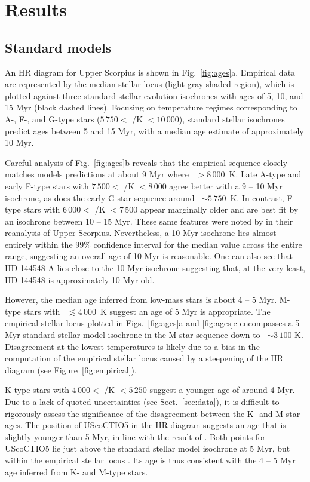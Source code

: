 \documentclass{aa}
\begin{document}
\section{Results}
\label{sec:results}

\subsection{Standard models}
An HR diagram for Upper Scorpius is shown in Fig.~\ref{fig:ages}a. Empirical data are represented by the median stellar locus (light-gray shaded region), which is plotted against three standard stellar evolution isochrones with ages of 5, 10, and 15 Myr (black dashed lines). Focusing on temperature regimes corresponding to A-, F-, and G-type stars ($5\,750 <$ \teff/K $< 10\,000$), standard stellar isochrones predict ages between 5 and 15 Myr, with a median age estimate of approximately 10 Myr. 

Careful analysis of Fig.~\ref{fig:ages}b reveals that the empirical sequence closely matches models predictions at about 9 Myr where \teff~$> 8\,000$~K. Late A-type and early F-type stars with $7\,500 < $ \teff/K $ < 8\,000$ agree better with a 9 -- 10 Myr isochrone, as does the early-G-star sequence around \teff\ $\sim 5\,750$~K. In contrast, F-type stars with $6\,000 <$ \teff/K $< 7\,500$ appear marginally older and are best fit by an isochrone between 10 -- 15 Myr. These same features were noted by \citet{Pecaut2012} in their reanalysis of Upper Scorpius. Nevertheless, a 10 Myr isochrone lies almost entirely within the 99\% confidence interval for the median value across the entire range, suggesting an overall age of 10 Myr is reasonable. One can also see that HD 144548 A lies close to the 10 Myr isochrone suggesting that, at the very least, HD 144548 is approximately 10 Myr old.

However, the median age inferred from low-mass stars is about 4 -- 5 Myr. M-type stars with \teff\ $\lesssim 4\,000$~K suggest an age of 5 Myr is appropriate. The empirical stellar locus plotted in Figs.~\ref{fig:ages}a and \ref{fig:ages}c encompasses a 5 Myr standard stellar model isochrone in the M-star sequence down to \teff\ $\sim3\,100$ K. Disagreement at the lowest temperatures is likely due to a bias in the computation of the empirical stellar locus caused by a steepening of the HR diagram (see Figure~\ref{fig:empirical}).

K-type stars with $4\,000 <$ \teff/K $< 5\,250$ suggest a younger age of around 4 Myr. Due to a lack of quoted uncertainties (see Sect.~\ref{sec:data}), it is difficult to rigorously assess the significance of the disagreement between the K- and M-star ages. The position of UScoCTIO5 in the HR diagram suggests an age that is slightly younger than 5 Myr, in line with the result of \citet{Kraus2015}. Both points for UScoCTIO5 lie just above the standard stellar model isochrone at 5 Myr, but within the empirical stellar locus \citep{Preibisch1999,Preibisch2002}. Its age is thus consistent with the 4 -- 5 Myr age inferred from K- and M-type stars.
\end{document}
